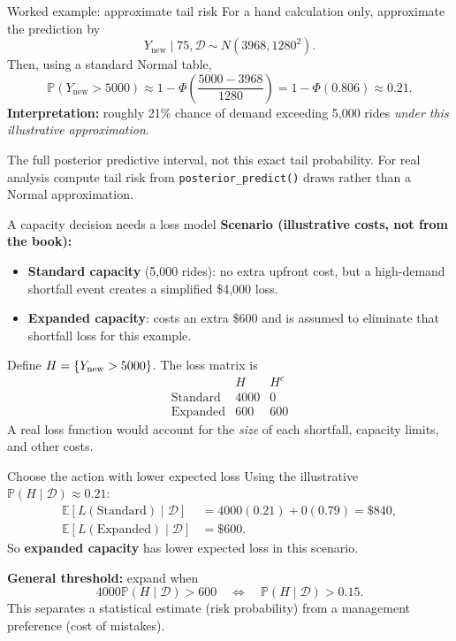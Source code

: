 \documentclass[aspectratio=43,11pt]{beamer}
\newcommand{\E}{\mathbb{E}}
\newcommand{\Prob}{\mathbb{P}}
\newcommand{\dd}{\mathcal D}
\begin{document}
\begin{frame}{Worked example: approximate tail risk}
For a hand calculation only, approximate the prediction by
\[Y_{\mathrm{new}}\mid75,\dd\ \dot\sim\ N(3968,1280^2).\]
Then, using a standard Normal table,
\[\Prob(Y_{\mathrm{new}}>5000)\approx 1-\Phi\!\left(\frac{5000-3968}{1280}\right)
=1-\Phi(0.806)\approx0.21.\]
\textbf{Interpretation:} roughly 21\% chance of demand exceeding 5,000 rides \emph{under this illustrative approximation}.
\par\medskip
\scriptsize The full posterior predictive interval, not this exact tail probability. For real analysis compute tail risk from \texttt{posterior\_predict()} draws rather than a Normal approximation.
\end{frame}

\begin{frame}{A capacity decision needs a loss model}
\textbf{Scenario (illustrative costs, not from the book):}
\begin{itemize}
\item \textbf{Standard capacity} (5,000 rides): no extra upfront cost, but a high-demand shortfall event creates a simplified \$4,000 loss.
\item \textbf{Expanded capacity}: costs an extra \$600 and is assumed to eliminate that shortfall loss for this example.
\end{itemize}
Define $H=\{Y_{\rm new}>5000\}$. The loss matrix is
\[\begin{array}{c|cc}
& H & H^c\\\hline
\text{Standard} &4000&0\\
\text{Expanded}&600&600
\end{array}\]
\scriptsize A real loss function would account for the \emph{size} of each shortfall, capacity limits, and other costs.
\end{frame}

\begin{frame}{Choose the action with lower expected loss}
Using the illustrative $\Prob(H\mid\dd)\approx0.21$:
\begin{align*}
\E[L(\text{Standard})\mid\dd]&=4000(0.21)+0(0.79)=\$840,\\
\E[L(\text{Expanded})\mid\dd]&=\$600.
\end{align*}
So \textbf{expanded capacity} has lower expected loss in this scenario.
\par\medskip\textbf{General threshold:} expand when
\[4000\Prob(H\mid\dd)>600\quad\Longleftrightarrow\quad \Prob(H\mid\dd)>0.15.\]
This separates a statistical estimate (risk probability) from a management preference (cost of mistakes).
\end{frame}
\end{document}
